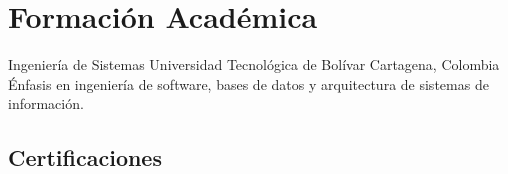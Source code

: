 \section{Formación Académica}

        {Ingeniería de Sistemas}
        {Universidad Tecnológica de Bolívar}
        {Cartagena, Colombia}{}
        {Énfasis en ingeniería de software, bases de datos y arquitectura de sistemas de información.}

\subsection{Certificaciones}


